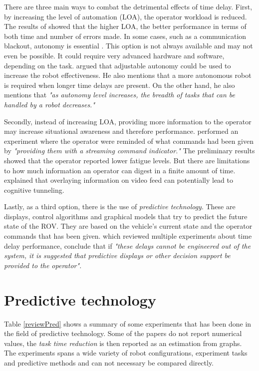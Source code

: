 There are three main ways to combat the detrimental effects of time delay. First, by increasing the level of automation (LOA), the operator workload is reduced. The results of \citep{Luck2006} showed that the higher LOA, the better performance in terms of both time and number of errors made. In some cases, such as a communication blackout, autonomy is essential \citep{Dorais1999}. This option is not always available and may not even be possible. It could require very advanced hardware and software, depending on the task. \citep{Goodrich2001} argued that adjustable autonomy could be used to increase the robot effectiveness. He also mentions that a more autonomous robot is required when longer time delays are present. On the other hand, he also mentions that \emph{"as autonomy level increases, the breadth of tasks that can be handled by a robot decreases."}

Secondly, instead of increasing LOA, providing more information to the operator may increase situational awareness and therefore performance. \citep{Miller2005} performed an experiment where the operator were reminded of what commands had been given by \emph{"providing them with a streaming command indicator."} The preliminary results showed that the operator reported lower fatigue levels. But there are limitations to how much information an operator can digest in a finite amount of time. \citep{Chen2007} explained that overlaying information on video feed can potentially lead to cognitive tunneling.

Lastly, as a third option, there is the use of \emph{predictive technology}. These are displays, control algorithms and graphical models that try to predict the future state of the ROV. They are based on the vehicle's current state and the operator commands that has been given. \citep{Chen2007} which reviewed multiple experiments about time delay performance, conclude that if \emph{"these delays cannot be engineered out of the system, it is suggested that predictive displays or other decision support be provided to the operator".}


\section{Predictive technology}



Table \ref{reviewPred} shows a summary of some experiments that has been done in the field of predictive technology. Some of the papers do not report numerical values, the \emph{task time reduction} is then reported as an estimation from graphs. The experiments spans a wide variety of robot configurations, experiment tasks and predictive methods and can not necessary be compared directly.


